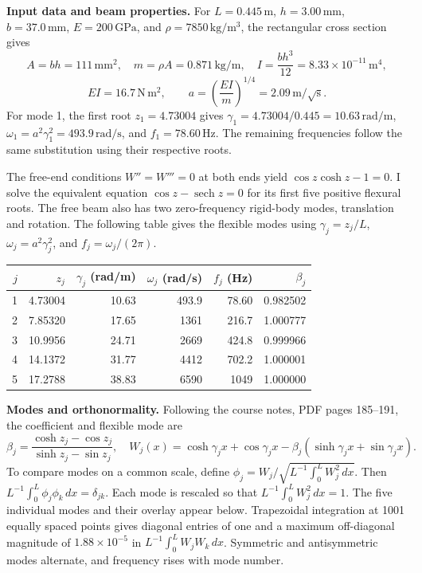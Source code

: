 \textbf{Input data and beam properties.} For $L=0.445\,\mathrm m$, $h=3.00\,\mathrm{mm}$, $b=37.0\,\mathrm{mm}$, $E=200\,\mathrm{GPa}$, and $\rho=7850\,\mathrm{kg/m^3}$, the rectangular cross section gives
\[
A=bh=111\,\mathrm{mm^2},\quad m=\rho A=0.871\,\mathrm{kg/m},\quad
I=\frac{bh^3}{12}=8.33\times10^{-11}\,\mathrm{m^4},
\]
\[
EI=16.7\,\mathrm{N\,m^2},\qquad a=\left(\frac{EI}{m}\right)^{1/4}=2.09\,\mathrm{m/\sqrt{s}}.
\]
For mode 1, the first root $z_1=4.73004$ gives $\gamma_1=4.73004/0.445=10.63\,\mathrm{rad/m}$, $\omega_1=a^2\gamma_1^2=493.9\,\mathrm{rad/s}$, and $f_1=78.60\,\mathrm{Hz}$. The remaining frequencies follow the same substitution using their respective roots.

The free-end conditions $W''=W'''=0$ at both ends yield $\cos z\cosh z-1=0$. I solve the equivalent equation $\cos z-\operatorname{sech}z=0$ for its first five positive flexural roots. The free beam also has two zero-frequency rigid-body modes, translation and rotation. The following table gives the flexible modes using $\gamma_j=z_j/L$, $\omega_j=a^2\gamma_j^2$, and $f_j=\omega_j/(2\pi)$.
\begin{center}
\begin{tabular}{rrrrrr}\toprule
$j$ & $z_j$ & $\gamma_j$ (rad/m) & $\omega_j$ (rad/s) & $f_j$ (Hz) & $\beta_j$\\ \midrule
1 & 4.73004 & 10.63 & 493.9 & 78.60 & 0.982502\\
2 & 7.85320 & 17.65 & 1361 & 216.7 & 1.000777\\
3 & 10.9956 & 24.71 & 2669 & 424.8 & 0.999966\\
4 & 14.1372 & 31.77 & 4412 & 702.2 & 1.000001\\
5 & 17.2788 & 38.83 & 6590 & 1049 & 1.000000\\ \bottomrule
\end{tabular}
\end{center}

\textbf{Modes and orthonormality.} Following the course notes, PDF pages 185--191, the coefficient and flexible mode are
\[
\beta_j=\frac{\cosh z_j-\cos z_j}{\sinh z_j-\sin z_j},\quad
W_j(x)=\cosh\gamma_jx+\cos\gamma_jx-\beta_j(\sinh\gamma_jx+\sin\gamma_jx).
\]
To compare modes on a common scale, define $\phi_j=W_j/\sqrt{L^{-1}\int_0^L W_j^2\,dx}$. Then $L^{-1}\int_0^L\phi_j\phi_k\,dx=\delta_{jk}$. Each mode is rescaled so that $L^{-1}\int_0^LW_j^2\,dx=1$. The five individual modes and their overlay appear below. Trapezoidal integration at 1001 equally spaced points gives diagonal entries of one and a maximum off-diagonal magnitude of $1.88\times10^{-5}$ in $L^{-1}\int_0^LW_jW_k\,dx$. Symmetric and antisymmetric modes alternate, and frequency rises with mode number.

